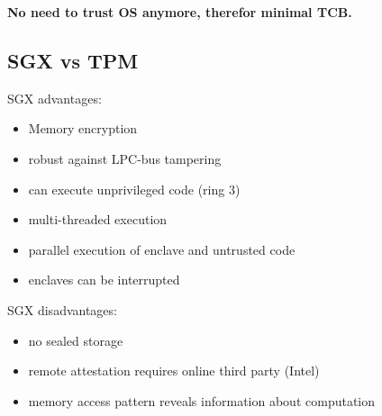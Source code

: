 \textbf{No need to trust OS anymore, therefor minimal TCB.}

\subsection{SGX vs TPM}
SGX advantages:
\begin{itemize}
    \item Memory encryption
    \item robust against LPC-bus tampering
    \item can execute unprivileged code (ring 3)
    \item multi-threaded execution
    \item parallel execution of enclave and untrusted code
    \item enclaves can be interrupted
\end{itemize}

SGX disadvantages:
\begin{itemize}
    \item no sealed storage
    \item remote attestation requires online third party (Intel)
    \item memory access pattern reveals information about computation
\end{itemize}
